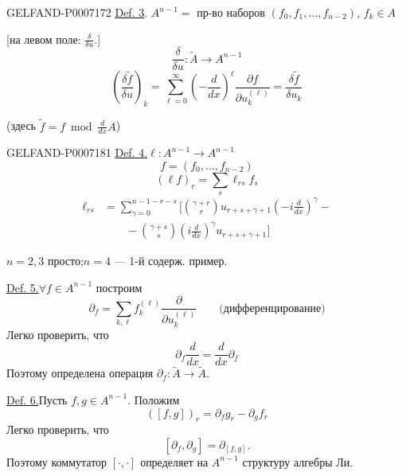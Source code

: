 \par\endgroup
\begin{GelfandAdjacentEvidence}{GELFAND-P000717}{2}
\underline{Def. 3}. \quad
\(A^{n-1}={}\) пр-во наборов \((f_0,f_1,\ldots,f_{n-2})\), \(f_k\in A\)

[на левом поле: \(\frac{\delta}{\delta u}\).]
\[
\frac{\delta}{\delta u}:\widetilde A\longrightarrow A^{n-1}
\]
\[
\left(\frac{\delta\widetilde f}{\delta u}\right)_k
=\sum_{\ell=0}^{\infty}\left(-\frac{d}{dx}\right)^\ell
\frac{\partial f}{\partial u_k^{(\ell)}}
=\frac{\delta\widetilde f}{\delta u_k}
\]
\end{GelfandAdjacentEvidence}

(здесь \(\widetilde f=f\bmod\frac{d}{dx}A\))


\begin{GelfandAdjacentEvidence}{GELFAND-P000718}{1}
\underline{Def. 4.}\quad \(\ell:A^{n-1}\longrightarrow A^{n-1}\)
\[
f=(f_0,\ldots,f_{n-2})
\]
\[
(\ell f)_r=\sum_s\ell_{rs}f_s
\]
\[
\begin{aligned}
\ell_{rs}&=\sum_{\gamma=0}^{n-1-r-s}
\Biggl[\binom{\gamma+r}{r}u_{r+s+\gamma+1}
\left(-i\frac{d}{dx}\right)^\gamma-\\
&\qquad-\binom{\gamma+s}{s}\left(i\frac{d}{dx}\right)^\gamma
u_{r+s+\gamma+1}\Biggr]
\end{aligned}
\]
\end{GelfandAdjacentEvidence}
\par\begingroup\setlength{\parindent}{0pt}\setlength{\parskip}{.4em}\raggedright


\underline{\(n=2,3\)} просто;\qquad \underline{\(n=4\)} --- 1-й содерж. пример.

\underline{Def. 5.}\quad \(\forall f\in A^{n-1}\) построим
\[
\partial_f=\sum_{k,\ell}f_k^{(\ell)}\frac{\partial}{\partial u_k^{(\ell)}}
\qquad\text{(дифференцирование)}
\]
Легко проверить, что
\[
\partial_f\frac{d}{dx}=\frac{d}{dx}\partial_f
\]
Поэтому определена операция \(\partial_f:\widetilde A\longrightarrow\widetilde A\).

\underline{Def. 6.}\quad Пусть \(f,g\in A^{n-1}\). Положим
\[
([f,g])_r=\partial_f g_r-\partial_g f_r
\]
Легко проверить, что
\[
[\partial_f,\partial_g]=\partial_{[f,g]}.
\]
Поэтому коммутатор \([\cdot,\cdot]\) определяет на \(A^{n-1}\) структуру алгебры Ли.

